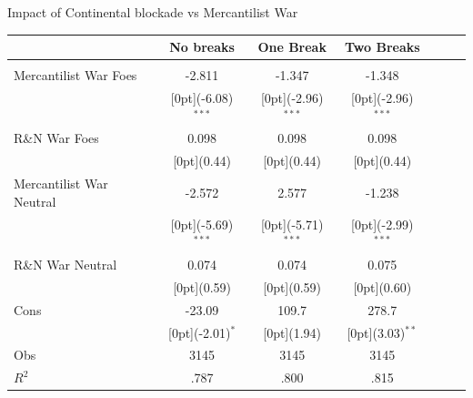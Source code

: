 \documentclass[11pt]{beamer}
\begin{document}
\begin{frame}{Impact of Continental blockade vs Mercantilist War}
\begin{tabular*}{\textwidth}{@{\extracolsep{\fill}}lcccccc}						
 &	\multicolumn{1}{c}{No breaks} &	\multicolumn{1}{c}{One Break} & \multicolumn{1}{c}{Two Breaks} & \\
\hline					
\hline \\					
Mercantilist War Foes & -2.811 & -1.347 &	-1.348  &\\
&	\raisebox{.7ex}[0pt]{\scriptsize (-6.08)$^{***}$} &	\raisebox{.7ex}[0pt]{\scriptsize (-2.96)$^{***}$} &	\raisebox{.7ex}[0pt]{\scriptsize (-2.96)$^{***}$} &\\
R\&N War Foes &	0.098 &0.098 &	0.098  &\\
 &	\raisebox{.7ex}[0pt]{\scriptsize (0.44)} &	\raisebox{.7ex}[0pt]{\scriptsize (0.44)} &	\raisebox{.7ex}[0pt]{\scriptsize (0.44)} \\
Mercantilist War Neutral &	-2.572 &2.577 &	-1.238  \\
 &	\raisebox{.7ex}[0pt]{\scriptsize (-5.69)$^{***}$} &	\raisebox{.7ex}[0pt]{\scriptsize (-5.71)$^{***}$} &	\raisebox{.7ex}[0pt]{\scriptsize (-2.99)$^{***}$} \\
R\&N War Neutral	 &	0.074 & 0.074 &	0.075 \\
 &	\raisebox{.7ex}[0pt]{\scriptsize (0.59)} &	\raisebox{.7ex}[0pt]{\scriptsize (0.59)} &	\raisebox{.7ex}[0pt]{\scriptsize (0.60)} \\
Cons &	-23.09 &	109.7  &	278.7 \\
 &	\raisebox{.7ex}[0pt]{\scriptsize (-2.01)$^{*}$} &	\raisebox{.7ex}[0pt]{\scriptsize (1.94)} &	\raisebox{.7ex}[0pt]{\scriptsize (3.03)$^{**}$} \\
\hline 
Obs  &	3145 &	3145  & 3145 \\
$ R^2$  &	.787 &	.800  & .815 \\

\hline\hline						
\end{tabular*}%
\end{frame}
\end{document}

